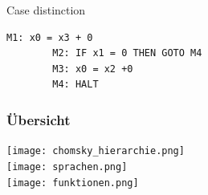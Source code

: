 \begin{example2}{Case distinction}
    \begin{lstlisting}[style=Pseudocode]
        M1: x0 = x3 + 0
        M2: IF x1 = 0 THEN GOTO M4
        M3: x0 = x2 +0
        M4: HALT
    \end{lstlisting}
\end{example2}

\subsubsection*{Übersicht}
\texttt{[image: chomsky\_hierarchie.png]}\\
\texttt{[image: sprachen.png]}\\
\texttt{[image: funktionen.png]}